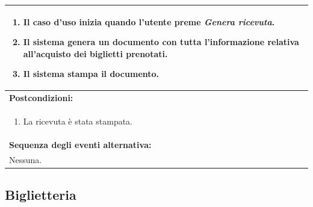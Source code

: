 \documentclass{article}
\begin{document}
\begin{table}[H]
\begin{tabular}{|p{\linewidth}|}
\begin{enumerate}
                            \item Il caso d'uso inizia quando l'utente preme \emph{Genera ricevuta}.
                            \item Il sistema genera un documento con tutta l'informazione relativa all'acquisto dei biglietti prenotati.
                            \item Il sistema stampa il documento.
                        \end{enumerate} \\
                        \hline
                        \cellcolor{gray!20}
                        \textbf{Postcondizioni:} \\
                        \cellcolor{gray!20}
                        \begin{minipage}{\linewidth}
                            \begin{enumerate}
                                \item La ricevuta è stata stampata.
                            \end{enumerate}
                        \end{minipage} \\
                        \hline
                        \textbf{Sequenza degli eventi alternativa:} \\
                        Nessuna. \\
                        \hline
                    \end{tabular}
                \end{table}

        \subsection{Biglietteria}
\end{document}
